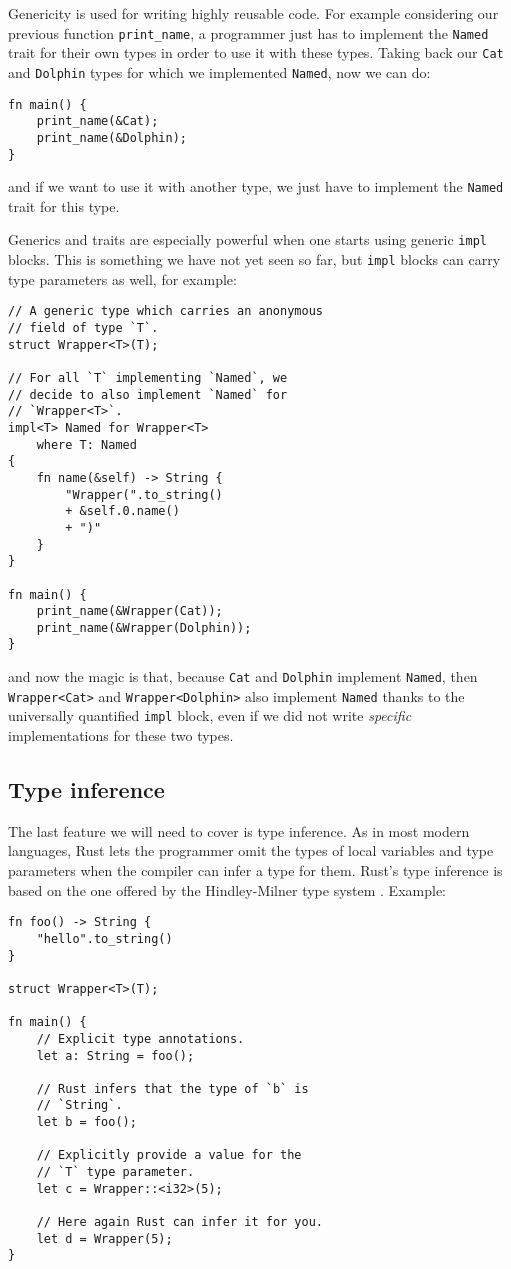 \documentclass[twocolumn]{article}
\newcommand{\rust}[1]{\texttt{#1}}
\begin{document}
Genericity is used for writing highly reusable code. For example considering our previous function \rust{print_name}, a programmer just has to implement the \rust{Named} trait for their own types in order to use it with these types. Taking back our \rust{Cat} and \rust{Dolphin} types for which we implemented \rust{Named}, now we can do:
\begin{verbatim}
fn main() {
    print_name(&Cat);
    print_name(&Dolphin);
}
\end{verbatim}
and if we want to use it with another type, we just have to implement the \rust{Named} trait for this type.

Generics and traits are especially powerful when one starts using generic \rust{impl} blocks. This is something we have not yet seen so far, but \rust{impl} blocks can carry type parameters as well, for example:
\begin{verbatim}
// A generic type which carries an anonymous
// field of type `T`.
struct Wrapper<T>(T);

// For all `T` implementing `Named`, we
// decide to also implement `Named` for
// `Wrapper<T>`.
impl<T> Named for Wrapper<T>
    where T: Named
{
    fn name(&self) -> String {
        "Wrapper(".to_string()
        + &self.0.name()
        + ")"
    }
}

fn main() {
    print_name(&Wrapper(Cat));
    print_name(&Wrapper(Dolphin));
}
\end{verbatim}
and now the magic is that, because \rust{Cat} and \rust{Dolphin} implement \rust{Named}, then \rust{Wrapper<Cat>} and \rust{Wrapper<Dolphin>} also implement \rust{Named} thanks to the universally quantified \rust{impl} block, even if we did not write \textit{specific} implementations for these two types.

\subsection{Type inference} \label{ty-inference}
The last feature we will need to cover is type inference. As in most modern languages, Rust lets the programmer omit the types of local variables and type parameters when the compiler can infer a type for them. Rust's type inference is based on the one offered by the Hindley-Milner type system \cite{inference1} \cite{inference2}. Example:
\begin{verbatim}
fn foo() -> String {
    "hello".to_string()
}

struct Wrapper<T>(T);

fn main() {
    // Explicit type annotations.
    let a: String = foo();
    
    // Rust infers that the type of `b` is
    // `String`.
    let b = foo();
    
    // Explicitly provide a value for the
    // `T` type parameter.
    let c = Wrapper::<i32>(5);
    
    // Here again Rust can infer it for you.
    let d = Wrapper(5);
}
\end{verbatim}
\end{document}

